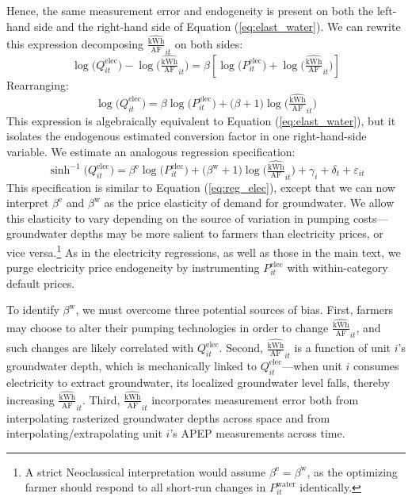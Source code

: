 Hence, the same measurement error and endogeneity is present on both the left-hand side and the right-hand side of Equation (\ref{eq:elast_water}).
We can rewrite this expression decomposing $\widehat{\tfrac{{\text{kWh}}}{\text{AF}}}_{it}$ on both sides:
\begin{equation}
\log\big(Q^{\text{elec}}_{it}\big) - \log\Big(\widehat{\tfrac{{\text{kWh}}}{\text{AF}}}_{it}\Big) = \beta \left[\log\big(P_{it}^{\text{elec}}\big) + \log\Big(\widehat{\tfrac{{\text{kWh}}}{\text{AF}}}_{it}\Big) \right]
\end{equation}
Rearranging:
\begin{equation}
\log\big(Q^{\text{elec}}_{it}\big) = \beta\log\big({P}^{\text{elec}}_{it}\big) + \big(\beta+1\big)\log\Big(\widehat{\tfrac{{\text{kWh}}}{\text{AF}}}_{it}\Big) 
\end{equation}
This expression is algebraically equivalent to Equation (\ref{eq:elast_water}), but it isolates the endogenous estimated conversion factor in one right-hand-side variable. We estimate an analogous regression specification:
\begin{equation}
\sinh^{-1}\big(Q^{\text{elec}}_{it}\big) = \beta^{\text{e}}\log\big({P}^{\text{elec}}_{it}\big) + \big(\beta^{\text{w}}+1\big)\log\Big(\widehat{\tfrac{{\text{kWh}}}{\text{AF}}}_{it}\Big) + \gamma_{i} + \delta_t + \varepsilon_{it} \label{eq:reg_water} 
\end{equation}
This specification is similar to Equation (\ref{eq:reg_elec}), except that we can now interpret $\beta^{\text{e}}$ and $\beta^{\text{w}}$ as the price elasticity of demand for groundwater. We allow this elasticity to vary depending on the source of variation in pumping costs---groundwater depths may be more salient to farmers than electricity prices, or vice versa.\footnote{
A strict Neoclassical interpretation would assume $\beta^{\text{e}} = \beta^{\text{w}}$, as the optimizing farmer should respond to all short-run changes in ${P}^{\text{water}}_{it}$ identically.
}
As in the electricity regressions, as well as those in the main text, we purge electricity price endogeneity by instrumenting $P^{\text{elec}}_{it}$ with within-category default prices.


To identify $\beta^{\text{w}}$, we must overcome three  potential sources of bias. First, farmers may choose to alter their pumping technologies in order to change $\widehat{\tfrac{{\text{kWh}}}{\text{AF}}}_{it}$, and such changes are likely correlated with $Q^{\text{elec}}_{it}$. Second, $\widehat{\tfrac{{\text{kWh}}}{\text{AF}}}_{it}$ is a function of unit $i$'s groundwater depth, which is mechanically linked to $Q^{\text{elec}}_{it}$---when unit $i$ consumes electricity to extract groundwater, its localized groundwater level falls, thereby increasing $\widehat{\tfrac{{\text{kWh}}}{\text{AF}}}_{it}$. Third, $\widehat{\tfrac{{\text{kWh}}}{\text{AF}}}_{it}$ incorporates measurement error both from interpolating rasterized groundwater depths across space and from interpolating/extrapolating unit $i$'s APEP measurements across time.

